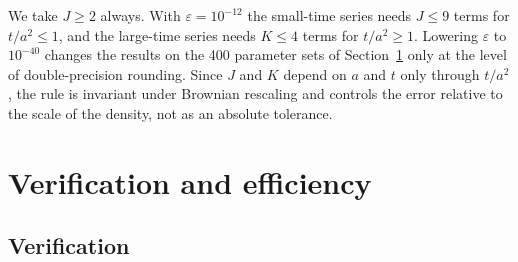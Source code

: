 \documentclass[final,5p,times,twocolumn,authoryear]{elsarticle}
\begin{document}
We take $J \ge 2$ always. With $\varepsilon = 10^{-12}$ the small-time series needs $J \le 9$ terms for $t/a^2 \le 1$, and the large-time series needs $K \le 4$ terms for $t/a^2 \ge 1$. Lowering $\varepsilon$ to $10^{-40}$ changes the results on the 400 parameter sets of Section~\ref{sec:verify} only at the level of double-precision rounding. Since $J$ and $K$ depend on $a$ and $t$ only through $t/a^2$, the rule is invariant under Brownian rescaling and controls the error relative to the scale of the density, not as an absolute tolerance.

\section{Verification and efficiency}
\label{sec:verify}

\subsection{Verification}
\end{document}
